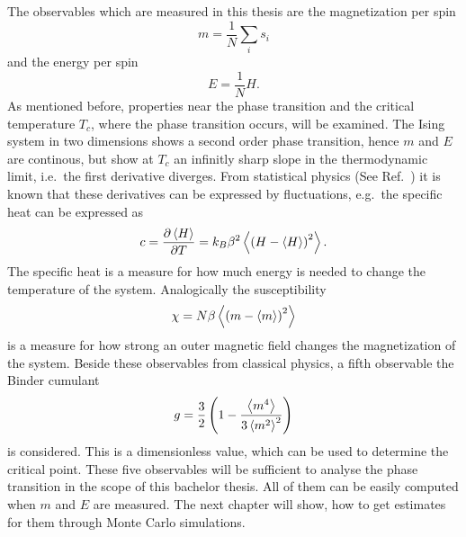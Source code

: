     The observables which are measured in this thesis are the
    magnetization per spin
    \begin{equation}
        m = \frac{1}{N} \sum_i s_i
    \end{equation}
    and the energy per spin
    \begin{equation}
        E = \frac{1}{N} H.
    \end{equation}
    As mentioned before, properties near the phase transition and the
    critical temperature \(T_c\), where the phase transition occurs, will
    be examined. The Ising system in two dimensions shows a second order
    phase transition, hence \(m\) and \(E\) are continous, but show at
    \(T_c\) an infinitly sharp slope in the thermodynamic limit, i.e.\
    the first derivative diverges.
    From statistical physics (See Ref.\ \cite{nolting2005}) it is known that
    these derivatives can be expressed by fluctuations, e.g.\ the specific
    heat can be expressed as
    \begin{equation}
        c = \frac{\partial \left< H \right>}{\partial T} = k_B \beta^2 \left< \left(H-\left< H \right>\right)^2 \right>.
    \end{equation}
    The specific heat is a measure for how much energy is needed to change
    the temperature of the system.
    Analogically the susceptibility
    \begin{equation}
        \chi = N \beta \left< \left(m-\left< m \right>\right)^2 \right>
    \end{equation}
    is a measure for how strong an outer magnetic field changes the
    magnetization of the system.
    Beside these observables from classical physics, a fifth observable
    the Binder cumulant \cite{Binder1981}
    \begin{equation}
        g = \frac{3}{2}\left(1-\frac{\left< m^4 \right>}{3\left< m^2 \right>^2}\right)
        \label{eq:binder}
    \end{equation}
    is considered.
    This is a dimensionless value, which can be used to determine the
    critical point. These five observables will be sufficient to analyse
    the phase transition in the scope of this bachelor thesis. All of them
    can be easily computed when \(m\) and \(E\) are measured. The next
    chapter will show, how to get estimates for them through Monte Carlo
    simulations.

